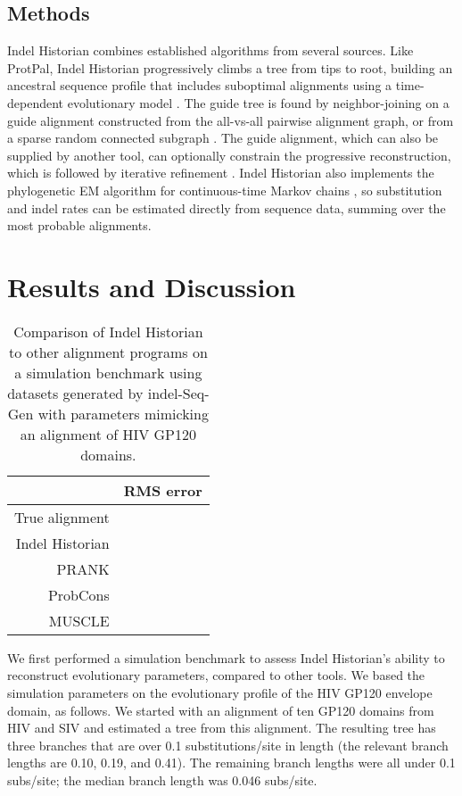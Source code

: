 \documentclass{bioinfo}
\begin{document}
\begin{methods}
\section{Methods}

Indel Historian combines established algorithms from several sources.
Like ProtPal, Indel Historian progressively climbs a tree from tips to root,
building an ancestral sequence profile that includes suboptimal alignments \citep{LeeGrassoSharlow2002,Westesson2012-zg}
using a time-dependent evolutionary model \citep{RivasEddy2015}.
The guide tree is found by neighbor-joining %
on a guide alignment constructed from the all-vs-all pairwise alignment graph,
or from a sparse random connected subgraph \citep{BradleyEtAl2009}.
The guide alignment, which can also be supplied by another tool,
can optionally constrain the progressive reconstruction,
which is followed by iterative refinement \citep{HolmesBruno2001,Edgar2004b}.
Indel Historian also implements the phylogenetic EM algorithm for continuous-time Markov chains \citep{HolmesRubin2002},
so substitution and indel rates can be estimated directly from sequence data,
summing over the most probable alignments.

\end{methods}

\section{Results and Discussion}

\begin{table}
  \begin{tabular}{r|r}
    & RMS error \\
    \hline
True alignment & \\
Indel Historian & \\
PRANK & \\
ProbCons & \\
MUSCLE & \\
  \end{tabular}
  \caption{
    Comparison of Indel Historian to other alignment programs on a simulation benchmark
    using datasets generated by indel-Seq-Gen \citep{StropeEtAl2009}
    with parameters mimicking an alignment of HIV GP120 domains.
  }
\end{table}

We first performed a simulation benchmark to assess Indel Historian's ability to reconstruct evolutionary parameters,
compared to other tools.
We based the simulation parameters on the evolutionary profile of the HIV GP120 envelope domain, as follows.
We started with an alignment of ten GP120 domains from HIV and SIV and estimated a tree from this alignment.
The resulting tree has three branches that are over 0.1 substitutions/site in length (the relevant branch lengths are 0.10, 0.19, and 0.41).
The remaining branch lengths were all under 0.1 subs/site; the median branch length was 0.046 subs/site.
\end{document}
